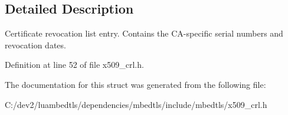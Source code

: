 \subsection{Detailed Description}
Certificate revocation list entry. Contains the C\-A-\/specific serial numbers and revocation dates. 

Definition at line 52 of file x509\-\_\-crl.\-h.



The documentation for this struct was generated from the following file\-:\begin{DoxyCompactItemize}
\item 
C\-:/dev2/luambedtls/dependencies/mbedtls/include/mbedtls/x509\-\_\-crl.\-h\end{DoxyCompactItemize}

